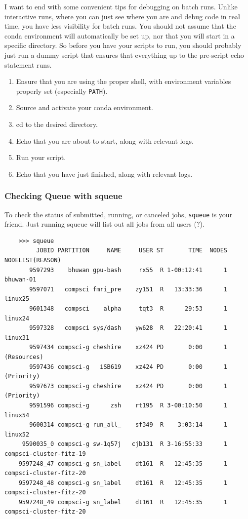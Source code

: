   \begin{theorem}
    \label{thm:tips-and-workflow-for-batch-scripts}
    I want to end with some convenient tips for debugging on batch runs. Unlike interactive runs, where you can just see where you are and debug code in real time, you have less visibility for batch runs. You should not assume that the conda environment will automatically be set up, nor that you will start in a specific directory. So before you have your scripts to run, you should probably just run a dummy script that ensures that everything up to the pre-script echo statement runs. 
    \begin{enumerate}
      \item Ensure that you are using the proper shell, with environment variables properly set (especially \texttt{PATH}). 
      \item Source and activate your conda environment. 
      \item cd to the desired directory. 
      \item Echo that you are about to start, along with relevant logs. 
      \item Run your script. 
      \item Echo that you have just finished, along with relevant logs. 
    \end{enumerate}
  \end{theorem}
 
\subsubsection{Checking Queue with squeue}

  To check the status of submitted, running, or canceled jobs, \texttt{squeue} is your friend. Just running squeue will list out all jobs from all users (?).  

  \begin{lstlisting}
    >>> squeue           
         JOBID PARTITION     NAME     USER ST       TIME  NODES NODELIST(REASON)
       9597293    bhuwan gpu-bash     rx55  R 1-00:12:41      1 bhuwan-01
       9597071   compsci fmri_pre    zy151  R   13:33:36      1 linux25
       9601348   compsci    alpha     tqt3  R      29:53      1 linux24
       9597328   compsci sys/dash    yw628  R   22:20:41      1 linux31
       9597434 compsci-g cheshire    xz424 PD       0:00      1 (Resources)
       9597436 compsci-g   iSB619    xz424 PD       0:00      1 (Priority)
       9597673 compsci-g cheshire    xz424 PD       0:00      1 (Priority)
       9591596 compsci-g      zsh    rt195  R 3-00:10:50      1 linux54
       9600314 compsci-g run_all_    sf349  R    3:03:14      1 linux52
     9590035_0 compsci-g sw-1q57j   cjb131  R 3-16:55:33      1 compsci-cluster-fitz-19
    9597248_47 compsci-g sn_label    dt161  R   12:45:35      1 compsci-cluster-fitz-20
    9597248_48 compsci-g sn_label    dt161  R   12:45:35      1 compsci-cluster-fitz-20
    9597248_49 compsci-g sn_label    dt161  R   12:45:35      1 compsci-cluster-fitz-20 
  \end{lstlisting} 

